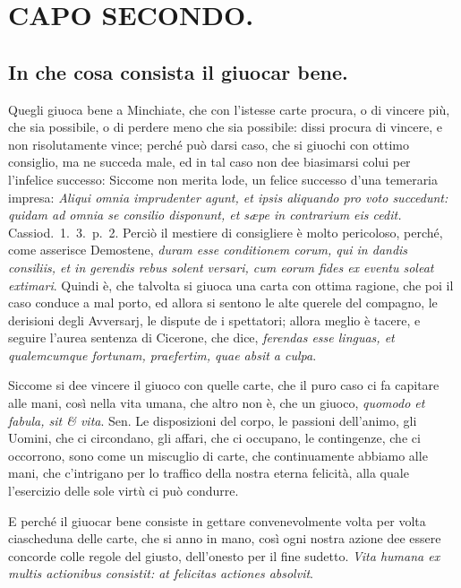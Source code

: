 \documentclass[11pt,a6paper]{article}
\begin{document}
\section{CAPO SECONDO.}

\subsection{In che cosa consista il giuocar bene.}

Quegli giuoca bene a Minchiate, che
con l'istesse carte procura, o di vincere
più, che sia possibile, o di perdere
meno che sia possibile: dissi procura di
vincere, e non risolutamente vince; perché
può darsi caso, che si giuochi con ottimo
consiglio, ma ne succeda male, ed in tal caso
non dee biasimarsi colui per l'infelice successo:
Siccome non merita lode, un felice successo
d'una temeraria impresa: \textit{Aliqui omnia imprudenter
agunt, et ipsis aliquando pro voto
succedunt: quidam ad omnia se consilio disponunt,
et sæpe in contrarium eis cedit.} Cassiod.\ 1.\ 3.\ p.\ 2.
Perciò il mestiere di consigliere
è molto pericoloso, perché, come asserisce
Demostene, \textit{duram esse conditionem corum,
qui in dandis consiliis, et in gerendis
rebus solent versari, cum eorum fides ex eventu
soleat extimari}. Quindi è, che talvolta si
giuoca una carta con ottima ragione, che poi
il caso conduce a mal porto, ed allora si sentono
le alte querele del compagno, le derisioni
degli Avversarj, le dispute de i spettatori;
allora meglio è tacere, e seguire l'aurea
sentenza di Cicerone, che dice, \textit{ferendas
esse linguas, et qualemcumque fortunam,
praefertim, quae absit a culpa}.

Siccome si dee vincere il giuoco con
quelle carte, che il puro caso ci fa capitare
alle mani, così nella vita umana, che altro
non è, che un giuoco, \textit{quomodo et fabula,
sit \& vita}. Sen. Le disposizioni del corpo, le
passioni dell'animo, gli Uomini, che ci circondano,
gli affari, che ci occupano, le contingenze,
che ci occorrono, sono come un
miscuglio di carte, che continuamente abbiamo
alle mani, che c'intrigano per lo traffico
della nostra eterna felicità, alla quale l'esercizio
delle sole virtù ci può condurre.

E perché il giuocar bene consiste in gettare
convenevolmente volta per volta ciascheduna
delle carte, che si anno in mano,
così ogni nostra azione dee essere concorde
colle regole del giusto, dell'onesto per il
fine sudetto. \textit{Vita humana ex multis actionibus
consistit: at felicitas actiones absolvit}.
\end{document}
